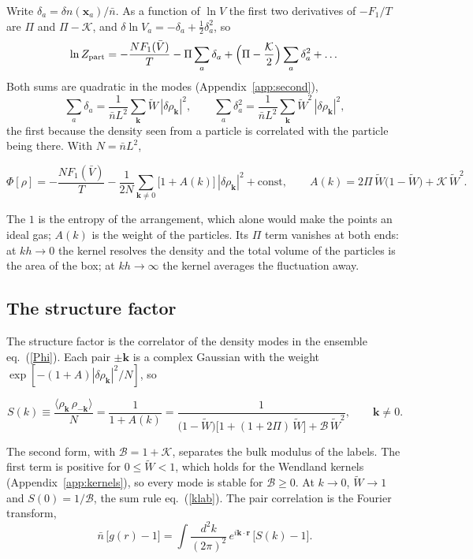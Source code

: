 \documentclass[11pt,aps,preprint,nofootinbib,superscriptaddress,tightenlines]{revtex4-2}
\newcommand{\avg}[1]{\langle #1\rangle}
\newcommand{\klab}{\mathcal B}
\def\st{\begin{equation}}
\def\stp{\end{equation}}
\def\Eq#1{eq.~(\ref{#1})}
\def\App#1{Appendix~\ref{#1}}
\begin{document}
Write $\delta_a=\delta n(\bm x_a)/\bar n$.  As a function of $\ln V$ the first two derivatives of $-F_1/T$ are $\Pi$ and $\Pi-\mathcal K$, and
$\delta\ln V_a=-\delta_a+\tfrac12\delta_a^2$, so
\st
\ln Z_{\rm part}=-\frac{NF_1(\bar V)}T-\Pi\sum_a\delta_a+\Big(\Pi-\frac{\mathcal K}2\Big)\sum_a\delta_a^2+\dots
\stp
Both sums are quadratic in the modes (\App{app:second}),
\st
\sum_a\delta_a=\frac1{\bar nL^2}\sum_{\bm k}\widetilde W\,|\delta\rho_{\bm k}|^2,\qquad \sum_a\delta_a^2=\frac1{\bar nL^2}\sum_{\bm k}\widetilde W^2\,|\delta\rho_{\bm k}|^2 ,
\stp
the first because the density seen from a particle is correlated with the particle being there.  With $N=\bar nL^2$,
\begin{keyeq}
\st
\Phi[\rho]=-\frac{NF_1(\bar V)}T-\frac1{2N}\sum_{\bm k\neq0}\big[1+A(k)\big]\,|\delta\rho_{\bm k}|^2+\text{const},\qquad
A(k)=2\Pi\,\widetilde W\big(1-\widetilde W\big)+\mathcal K\,\widetilde W^2 .
\label{Ak}
\stp
\end{keyeq}
The $1$ is the entropy of the arrangement, which alone would make the points an ideal gas; $A(k)$ is the weight of the particles.  Its $\Pi$ term vanishes at both
ends: at $kh\to0$ the kernel resolves the density and the total volume of the particles is the area of the box; at $kh\to\infty$ the kernel averages the
fluctuation away.

\subsection{The structure factor}
\label{sec:Sk}

The structure factor is the correlator of the density modes in the ensemble \Eq{Phi}.  Each pair $\pm\bm k$ is a complex Gaussian with the weight
$\exp[-(1+A)|\delta\rho_{\bm k}|^2/N]$, so
\begin{keyeq}
\st
S(k)\equiv\frac{\avg{\rho_{\bm k}\,\rho_{-\bm k}}}N=\frac1{1+A(k)}
=\frac1{\big(1-\widetilde W\big)\big[1+(1+2\Pi)\,\widetilde W\big]+\klab\,\widetilde W^2},\qquad \bm k\neq0 .
\label{Sk}
\stp
\end{keyeq}
The second form, with $\klab=1+\mathcal K$, separates the bulk modulus of the labels.  The first term is positive for $0\le\widetilde W<1$, which holds for the Wendland
kernels (\App{app:kernels}), so every mode is stable for $\klab\ge0$.  At $k\to0$, $\widetilde W\to1$ and $S(0)=1/\klab$, the sum rule \Eq{klab}.  The pair correlation
is the Fourier transform,
\st
\bar n\,\big[g(r)-1\big]=\int\frac{d^2k}{(2\pi)^2}\,e^{i\bm k\cdot\bm r}\,\big[S(k)-1\big] .
\stp
\end{document}
